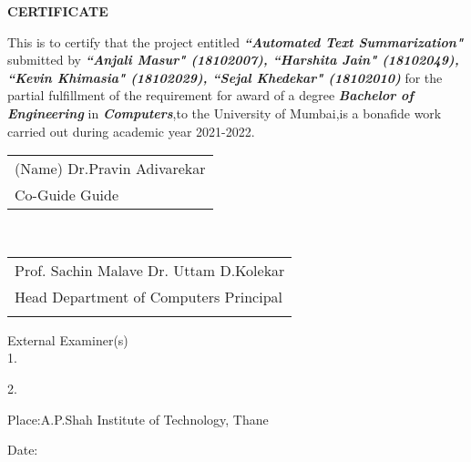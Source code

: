\newpage
\thispagestyle{empty}
\vspace*{0.2cm}
\vspace{1cm}
\begin{center}
 \large\textbf{CERTIFICATE}
\end{center}
\vspace{1cm}

\par This is to certify that the project entitled \textbf{\textit{``Automated Text Summarization"}} submitted by \textbf{\textit{``Anjali Masur" (18102007), ``Harshita Jain" (18102049), ``Kevin Khimasia" (18102029), ``Sejal Khedekar" (18102010)}}  for the partial fulfillment of the requirement for award of a degree \textbf{\textit{Bachelor of Engineering} }in\textbf{ \textit{Computers}},to the University of Mumbai,is a bonafide work carried out during academic year 2021-2022.\\

\vspace{25mm}
\begin{tabular}{@{}l@{}}
(Name)\hspace{95mm}       Dr.Pravin Adivarekar\\
Co-Guide \hspace{95mm}      Guide\\

\end{tabular}
\vspace{30mm}\\
\hfill
\begin{tabular}{@{}l@{}}
\hspace{5mm} Prof. Sachin Malave\hspace{65mm}       Dr. Uttam D.Kolekar\\
\hspace{5mm}Head Department of Computers \hspace{40mm} Principal\\
\vspace{5mm}
\end{tabular}

\vspace{20mm}
External Examiner(s)\\

1. \\
\vspace{10mm}

2. \\
\vspace{10mm}

Place:A.P.Shah Institute of Technology, Thane\par
\vspace{1mm}

Date:
\clearpage

\vspace{5mm}

